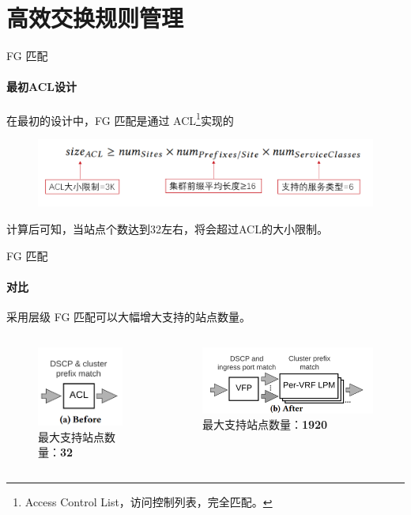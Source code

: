 \section{高效交换规则管理}
\begin{frame}{FG 匹配}
    \framesubtitle{最初ACL设计}
    在最初的设计中，FG 匹配是通过 ACL\footnote{Access Control List，访问控制列表，完全匹配。}实现的
    \begin{figure}
        \centering
        \includegraphics[width=0.7\linewidth]{img/FG.png}
        \label{fig:my_label}
    \end{figure}
    计算后可知，当站点个数达到32左右，将会超过ACL的大小限制。
\end{frame}

\begin{frame}{FG 匹配}
    \framesubtitle{对比}
    采用层级 FG 匹配可以大幅增大支持的站点数量。
    \begin{columns}
        \begin{column}{0.4\textwidth}
            \begin{figure}
                \centering
                \includegraphics[width=0.4\linewidth]{img/FG2.png}
                \caption{最大支持站点数量：\textbf{32}}
            \end{figure}
        \end{column}
        \begin{column}{0.4\textwidth}
            \begin{figure}
                \centering
                \includegraphics[width=0.8\linewidth]{img/FG3.png}
                \caption{最大支持站点数量：\textbf{1920}}
            \end{figure}
        \end{column}
    \end{columns}
\end{frame}

